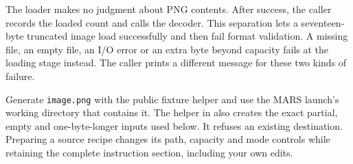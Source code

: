 The loader makes no judgment about PNG contents. After success, the caller records
the loaded count and calls the decoder. This separation lets a seventeen-byte
truncated image load successfully and then fail format validation. A missing file,
an empty file, an I/O error or an extra byte beyond capacity fails at the loading
stage instead. The caller prints a different message for these two kinds of failure.

Generate \texttt{image.png} with the public fixture helper and use the MARS launch's
working directory that contains it. The helper in 
also creates the exact partial, empty and one-byte-longer inputs used below. It refuses
an existing destination. Preparing a source recipe changes its path, capacity and mode
controls while retaining the complete instruction section, including your own edits.
